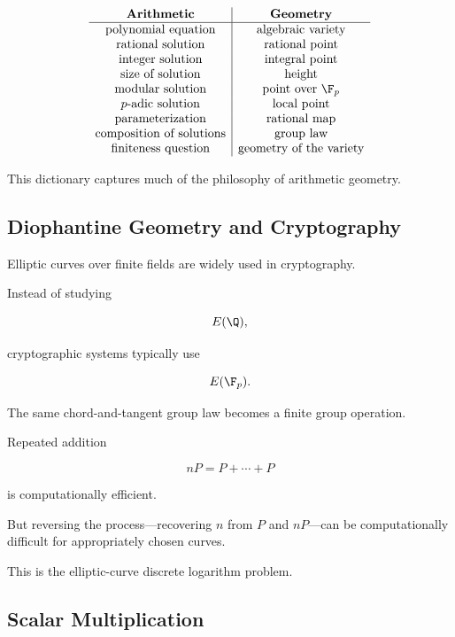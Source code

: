 \[
\begin{array}{c|c}
\textbf{Arithmetic} & \textbf{Geometry}\\
\hline
\text{polynomial equation} & \text{algebraic variety}\\
\text{rational solution} & \text{rational point}\\
\text{integer solution} & \text{integral point}\\
\text{size of solution} & \text{height}\\
\text{modular solution} & \text{point over }\F_p\\
\text{\(p\)-adic solution} & \text{local point}\\
\text{parameterization} & \text{rational map}\\
\text{composition of solutions} & \text{group law}\\
\text{finiteness question} & \text{geometry of the variety}
\end{array}
\]

This dictionary captures much of the philosophy of arithmetic geometry.

\subsection{Diophantine Geometry and Cryptography}
\label{subsec:diophantine-geometry-cryptography}

Elliptic curves over finite fields are widely used in cryptography.

Instead of studying

\[ E(\Q), \]

cryptographic systems typically use

\[ E(\F_p). \]

The same chord-and-tangent group law becomes a finite group operation.

Repeated addition

\[ nP=P+\cdots+P \]

is computationally efficient.

But reversing the process---recovering \(n\) from \(P\) and \(nP\)---can be
computationally difficult for appropriately chosen curves.

This is the elliptic-curve discrete logarithm problem.

\subsection{Scalar Multiplication}
\label{subsec:elliptic-scalar-multiplication}

